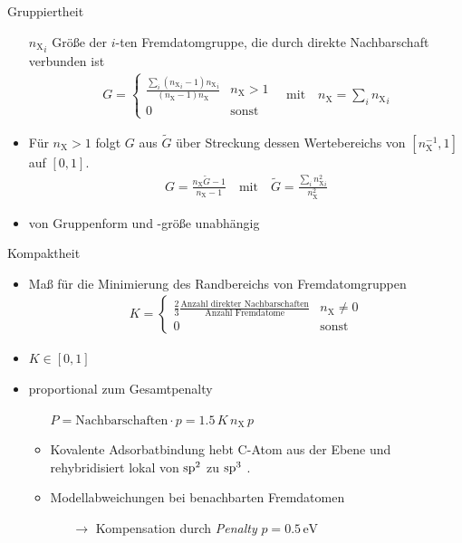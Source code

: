 \documentclass{beamer}
\def \nX {n_\mathrm{X}}
\begin{document}
	\begin{frame}{Gruppiertheit}
		\begin{itemize}
			\item[${\nX}_i$] Größe der $i$-ten Fremdatomgruppe, die durch direkte Nachbarschaft verbunden ist
			\begin{align*}
				G = \begin{cases} \frac{\sum_i ({\nX}_i - 1) {\nX}_i}{(\nX - 1) \nX} & \nX > 1 \\ 0 & \text{sonst} \end{cases} \quad \text{mit} \quad \nX = \sum_i {\nX}_i
			\end{align*}
			\item Für $\nX > 1$ folgt $G$ aus $\tilde G$ über Streckung dessen Wertebereichs von $[\nX^{-1}, 1]$ auf $[0, 1]$.
			\begin{align*}
				G  = \frac{\nX \tilde G - 1}{\nX - 1} \quad \text{mit} \quad \tilde G = \frac{\sum_i {\nX^2}_i}{\nX^2}
			\end{align*}
			\item von Gruppenform und -größe unabhängig
		\end{itemize}
	\end{frame}

	\begin{frame}{Kompaktheit}
		\begin{itemize}
			\item Maß für die Minimierung des Randbereichs von Fremdatomgruppen
			\begin{align*}
				K = \begin{cases} \frac 2 3 \frac{\text{Anzahl direkter Nachbarschaften}}{\text{Anzahl Fremdatome}} & \nX \neq 0 \\ 0 & \text{sonst} \end{cases}
			\end{align*}
			\item $K \in [0, 1]$
			\item proportional zum Gesamtpenalty
			\begin{itemize}
				\item[] $P = \text{Nachbarschaften} \cdot p = 1.5 \, K \, \nX \, p$
				
				\medskip
				
				\item Kovalente Adsorbatbindung hebt C-Atom aus der Ebene und rehybridisiert lokal von $\rm sp^2$ zu $\rm sp^3$ \cite{Wehling}.
				\item Modellabweichungen bei benachbarten Fremdatomen
				\begin{itemize}
					\item[$\rightarrow$] Kompensation durch \emph{Penalty} $p = 0.5\,\mathrm{eV}$
				\end{itemize}
			\end{itemize}
		\end{itemize}
	\end{frame}
\end{document}
